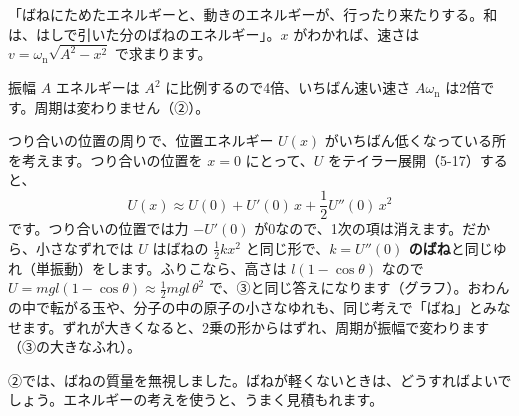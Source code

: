 \begin{phyomi}[$\tfrac{1}{2}mv^2+\tfrac{1}{2}kx^2=\tfrac{1}{2}kA^2$]
「ばねにためたエネルギーと、動きのエネルギーが、行ったり来たりする。和は、はしで引いた分のばねのエネルギー」。$x$ がわかれば、速さは $v=\omega_{\mathrm n}\sqrt{A^2-x^2}$ で求まります。
\end{phyomi}

\begin{phbaisuru}{振幅 $A$}
エネルギーは $A^2$ に比例するので4倍、いちばん速い速さ $A\omega_{\mathrm n}$ は2倍です。周期は変わりません（②）。
\end{phbaisuru}

\begin{motto}[4]
つり合いの位置の周りで、位置エネルギー $U(x)$ がいちばん低くなっている所を考えます。つり合いの位置を $x=0$ にとって、$U$ をテイラー展開（5-17）すると、
\[U(x)\approx U(0)+U'(0)\,x+\frac{1}{2}U''(0)\,x^2\]
です。つり合いの位置では力 $-U'(0)$ が0なので、1次の項は消えます。だから、小さなずれでは $U$ はばねの $\tfrac{1}{2}kx^2$ と同じ形で、\textbf{$k=U''(0)$ のばね}と同じゆれ（単振動）をします。ふりこなら、高さは $l(1-\cos\theta)$ なので $U=mgl(1-\cos\theta)\approx\tfrac{1}{2}mgl\,\theta^2$ で、③と同じ答えになります（グラフ）。おわんの中で転がる玉や、分子の中の原子の小さなゆれも、同じ考えで「ばね」とみなせます。ずれが大きくなると、2乗の形からはずれ、周期が振幅で変わります（③の大きなふれ）。
\par\smallskip\noindent\begin{center}
\end{center}
\end{motto}

②では、ばねの質量を無視しました。ばねが軽くないときは、どうすればよいでしょう。エネルギーの考えを使うと、うまく見積もれます。

